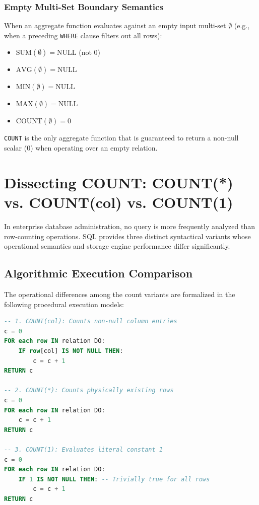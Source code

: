 \documentclass[10pt,twocolumn,letterpaper]{article}
\begin{document}
\subsubsection{Empty Multi-Set Boundary Semantics}
When an aggregate function evaluates against an empty input multi-set $\emptyset$ (e.g., when a preceding \texttt{WHERE} clause filters out all rows):
\begin{itemize}
    \item $\text{SUM}(\emptyset) = \text{NULL}$ (not 0)
    \item $\text{AVG}(\emptyset) = \text{NULL}$
    \item $\text{MIN}(\emptyset) = \text{NULL}$
    \item $\text{MAX}(\emptyset) = \text{NULL}$
    \item $\text{COUNT}(\emptyset) = 0$
\end{itemize}
\texttt{COUNT} is the only aggregate function that is guaranteed to return a non-null scalar ($0$) when operating over an empty relation.

\section{Dissecting COUNT: COUNT(*) vs. COUNT(col) vs. COUNT(1)}
\label{sec:count_variants}

In enterprise database administration, no query is more frequently analyzed than row-counting operations. SQL provides three distinct syntactical variants whose operational semantics and storage engine performance differ significantly.

\subsection{Algorithmic Execution Comparison}
The operational differences among the count variants are formalized in the following procedural execution models:

\begin{lstlisting}[language=SQL]
-- 1. COUNT(col): Counts non-null column entries
c = 0
FOR each row IN relation DO:
    IF row[col] IS NOT NULL THEN:
        c = c + 1
RETURN c

-- 2. COUNT(*): Counts physically existing rows
c = 0
FOR each row IN relation DO:
    c = c + 1
RETURN c

-- 3. COUNT(1): Evaluates literal constant 1
c = 0
FOR each row IN relation DO:
    IF 1 IS NOT NULL THEN: -- Trivially true for all rows
        c = c + 1
RETURN c
\end{lstlisting}
\end{document}
